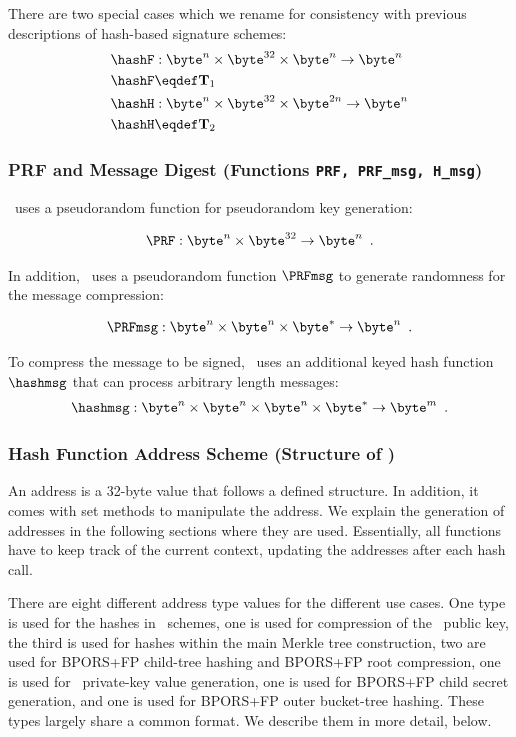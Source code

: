 There are two special cases which we rename for consistency with previous descriptions of hash-based signature schemes:
\begin{align*}
    \hashF& : \byte^{n}\times \byte^{32}\times \byte^{n}\rightarrow \byte^{n} \\
    \hashF& \eqdef \mathbf{T}_1\\
    \hashH& : \byte^{n}\times \byte^{32}\times \byte^{2n}\rightarrow \byte^{n} \\
    \hashH& \eqdef \mathbf{T}_2
\end{align*}

\subsubsection{PRF and Message Digest (Functions \texttt{PRF, PRF\_msg, H\_msg})}

\SPHINCSA\ uses a pseudorandom function \PRF for pseudorandom key generation:

\[\PRF : \byte^{n}\times \byte^{32}\rightarrow \byte^{n} \enspace.\]

In addition, \SPHINCSA\ uses a pseudorandom function $\PRFmsg$ to generate randomness for the message compression:

\[\PRFmsg : \byte^{n}\times \byte^{n}\times \byte^{*}\rightarrow \byte^{n} \enspace.\]

To compress the message to be signed, \SPHINCSA\ uses an additional keyed hash function $\hashmsg$ that can process arbitrary length messages:
\[ \hashmsg : \byte^{n}\times \byte^{n}\times \byte^{n}\times \byte^{*}\rightarrow \byte^{m} \enspace.\]

\subsubsection{Hash Function Address Scheme (Structure of {\ADRS})} \label{sec:addr}

An address \ADRS is a 32-byte value that follows a defined structure. In addition, it comes with set methods to manipulate the address. We explain the generation of addresses in the following sections where they are used. Essentially, all functions have to keep track of the current context, updating the addresses after each hash call.

There are eight different address type values for the different use cases. One
type is used for the hashes in \WOTSCS\ schemes, one is used for compression of
the \WOTSCS\ public key, the third is used for hashes within the main Merkle
tree construction, two are used for BPORS+FP child-tree hashing and BPORS+FP
root compression, one is used for \WOTSCS\ private-key value generation, one is
used for BPORS+FP child secret generation, and one is used for BPORS+FP outer
bucket-tree hashing. These types largely share a common format. We describe
them in more detail, below.

